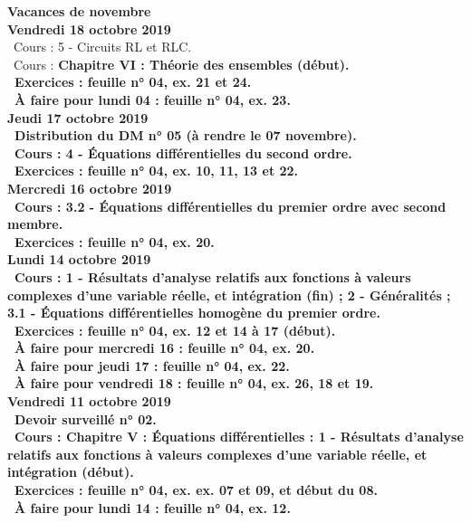 \documentclass[12pt,a4paper]{article}
\begin{document}
\noindent\textbf{ Vacances de novembre }\vspace{.4cm}\\
 
\noindent\textbf{Vendredi 18 octobre 2019}\\
\bu\ Cours : 5 - Circuits RL et RLC.\\
\bu\ Cours : \bf Chapitre VI \rm : Théorie des ensembles (début).\\
\bu\ Exercices : feuille n° 04, ex. 21 et 24.\\
\bu\ À faire pour lundi 04 : feuille n° 04, ex. 23.\vspace{.4cm}\\

\noindent\textbf{Jeudi 17 octobre 2019}\\
\bu\ Distribution du DM n° 05 (à rendre le 07 novembre).\\
\bu\ Cours : 4 - Équations différentielles du second ordre.\\
\bu\ Exercices : feuille n° 04, ex. 10, 11, 13 et 22.\vspace{.4cm}\\

\noindent\textbf{\bf Mercredi 16 octobre 2019}\\
\bu\ Cours : 3.2 - Équations différentielles du premier ordre avec second membre.\\
\bu\ Exercices : feuille n° 04, ex. 20.\vspace{.4cm}\\
  
\noindent\textbf{Lundi 14 octobre 2019}\\
\bu\ Cours : 1 - Résultats d'analyse relatifs aux fonctions à valeurs complexes d'une variable réelle, et 
intégration (fin) ; 2 - Généralités ; 3.1 - Équations différentielles homogène du premier ordre.\\
\bu\ Exercices : feuille n° 04, ex. 12 et 14 à 17 (début).\\
\bu\ À faire pour mercredi 16 : feuille n° 04, ex. 20.\\
\bu\ À faire pour jeudi 17 : feuille n° 04, ex. 22.\\
\bu\ À faire pour vendredi 18 : feuille n° 04, ex. 26, 18 et 19.\vspace{.4cm}\\
  
\noindent\textbf{Vendredi 11 octobre 2019}\\
\bu\ Devoir surveillé n° 02.\\
 \bu\ Cours : \bf Chapitre V \rm : Équations différentielles : 1 - Résultats d'analyse relatifs aux fonctions à 
valeurs complexes d'une variable réelle, et intégration (début).\\
 \bu\ Exercices : feuille n° 04, ex. ex. 07 et 09, et début du 08.\\
 \bu\ À faire pour lundi 14 : feuille n° 04, ex. 12.\vspace{.4cm}\\
  
\end{document}
